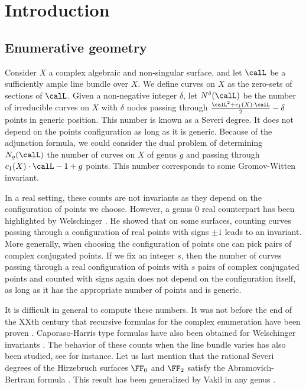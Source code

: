 \section{Introduction}


\subsection{Enumerative geometry}


Consider $X$ a complex algebraic and non-singular surface, and let $\calL$ be a sufficiently ample line bundle over $X$. We define curves on $X$ as the zero-sets of sections of $\calL$. Given a non-negative integer $\delta$, let $N^\delta(\calL)$ be the number of irreducible curves on $X$ with $\delta$ nodes passing through $\frac{\calL^2 + c_1(X)\cdot\calL}{2}-\delta$ points in generic position. This number is known as a Severi degree. It does not depend on the points configuration as long as it is generic. Because of the adjunction formula, we could consider the dual problem of determining $N_g(\calL)$ the number of curves on $X$ of genus $g$ and passing through $c_1(X)\cdot\calL-1+g$ points. This number corresponds to some Gromov-Witten invariant.

In a real setting, these counts are not invariants as they depend on the configuration of points we choose. However, a genus $0$ real counterpart has been highlighted by Welschinger \cite{welschinger_invariants_2005}. 
He showed that on some surfaces, counting curves passing through a configuration of real points with signs $\pm 1$ leads to an invariant.
More generally, when choosing the configuration of points one can pick pairs of complex conjugated points. If we fix an integer $s$, then the number of curves passing through a real configuration of points with $s$ pairs of complex conjugated points and counted with signs again does not depend on the configuration itself, as long as it has the appropriate number of points and is generic.

It is difficult in general to compute these numbers. It was not before the end of the XXth century that recursive formulas for the complex enumeration have been proven \cite{kontsevich_gromov-witten_1994,caporaso_counting_1998}. Caporaso-Harris type formulas have also been obtained for Welschinger invariants \cite{itenberg-2009-caporaso}.
 The behavior of these counts when the line bundle varies has also been studied, see \cite{di_francesco_quantum_1995, gottsche_conjectural_1998, fomin_labeled_2010, tzeng_proof_2012}  for instance.
Let us last mention that the rational Severi degrees of the Hirzebruch surfaces $\FF_0$ and $\FF_2$ satisfy the Abramovich-Bertram formula \cite{abramovich-2001-formula}. This result has been generalized by Vakil in any genus \cite{vakil-2000-counting}.

